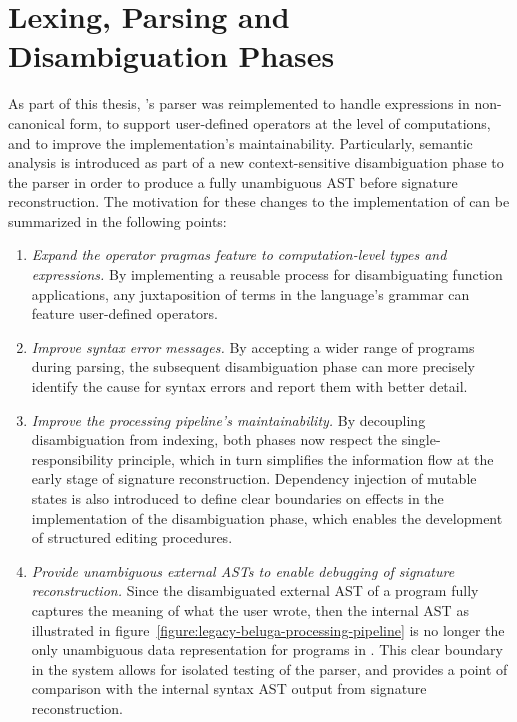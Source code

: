 \clearpage

\section{\Beluga Lexing, Parsing and Disambiguation Phases}\label{section:lexing-parsing-disambiguation}

As part of this thesis, \Beluga's parser was reimplemented to handle expressions in non-canonical form, to support user-defined operators at the level of computations, and to improve the implementation's maintainability.
Particularly, semantic analysis is introduced as part of a new context-sensitive disambiguation phase to the parser in order to produce a fully unambiguous \ac{AST} before signature reconstruction.
The motivation for these changes to the implementation of \Beluga can be summarized in the following points:
\begin{enumerate}
\item
\textit{Expand the operator pragmas feature to computation-level types and expressions.}
By implementing a reusable process for disambiguating function applications, any juxtaposition of terms in the language's grammar can feature user-defined operators.
\item
\textit{Improve syntax error messages.}
By accepting a wider range of programs during parsing, the subsequent disambiguation phase can more precisely identify the cause for syntax errors and report them with better detail.
\item
\textit{Improve the processing pipeline's maintainability.}
By decoupling disambiguation from indexing, both phases now respect the single-responsibility principle, which in turn simplifies the information flow at the early stage of signature reconstruction.
Dependency injection of mutable states is also introduced to define clear boundaries on effects in the implementation of the disambiguation phase, which enables the development of structured editing procedures.
\item
\textit{Provide unambiguous external \acp{AST} to enable debugging of signature reconstruction.}
Since the disambiguated external \ac{AST} of a program fully captures the meaning of what the user wrote, then the internal \ac{AST} as illustrated in figure~\ref{figure:legacy-beluga-processing-pipeline} is no longer the only unambiguous data representation for programs in \Beluga.
This clear boundary in the system allows for isolated testing of the parser, and provides a point of comparison with the internal syntax \ac{AST} output from signature reconstruction.
\end{enumerate}

